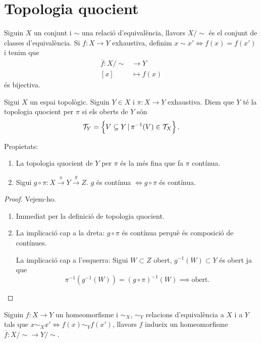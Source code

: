 \section{Topologia quocient}
\begin{obs}
    Siguin $X$ un conjunt i $\sim$ una relació d'equivalència, llavors $X/\sim$ \'es el conjunt de classes d'equivalència. Si $f\colon X\rightarrow Y$ exhaustiva, definim $x\sim x' \iff f(x) = f(x')$ i tenim que
    \begin{align*}
        \overline{f} \colon X/\sim &\rightarrow Y \\
        \left[ x \right] &\mapsto f(x)
    \end{align*}
    \'es bijectiva.
\end{obs}
\begin{defi}
    Sigui $X$ un espai topològic. Siguin $Y\in X$ i $\pi \colon X \rightarrow Y$ exhaustiva. Diem que $Y$ t\'e la topologia quocient per $\pi$ si els oberts de $Y$ són
    \[ \mathcal{T}_Y = \left\{ V\subseteq Y\,|\,\pi^{-1}(V) \in \mathcal{T}_X \right\}. \]
\end{defi}
\begin{prop}
    Propietats:
    \begin{enumerate}
        \item La topologia quocient de $Y$ per $\pi$ \'es la m\'es fina que fa $\pi$ contínua.
        \item Sigui $g\circ\pi \colon X \stackrel{\pi}{\rightarrow} Y \stackrel{g}{\rightarrow} Z$. $g$ \'es contínua $\iff g\circ\pi$ \'es contínua.
    \end{enumerate}
\end{prop}
\begin{proof}
    Vejem-ho.
    \begin{enumerate}
        \item Immediat per la definició de topologia quocient.
        \item La implicació cap a la dreta: $g \circ \pi$ \'es contínua perquè \'es composició de contínues.

            La implicació cap a l'esquerra: Sigui $W \subset Z$ obert, $g^{-1}(W) \subset Y$ \'es obert ja que
            \[\pi^{-1}\left( g^{-1}\left( W \right) \right) = \left( g\circ \pi \right)^{-1}\left( W \right) \implies \text{obert.}\]
    \end{enumerate}
\end{proof}
\begin{prop}
    Siguin $f\colon X\rightarrow Y$ un homeomorfisme i $\sim_X$, $\sim_Y$ relacions d'equivalència a $X$ i a $Y$ tals que $x \sim_X x' \iff f\left( x \right) \sim_Y f\left( x' \right)$, llavors $f$ indueix un homeomorfisme $\overline{f} \colon X/\sim \rightarrow Y/\sim$.
\end{prop}


